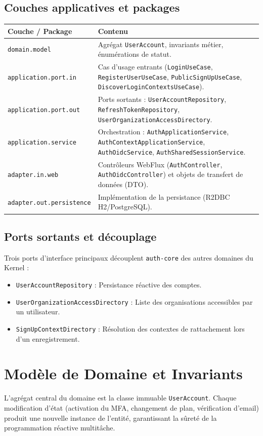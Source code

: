 \documentclass[11pt,a4paper,oneside]{report}
\newcommand{\code}[1]{\texttt{\small #1}}
\begin{document}
\subsection{Couches applicatives et packages}
\begin{center}
\small
\begin{longtable}{@{}p{4cm}p{10cm}@{}}
\toprule
\textbf{Couche / Package} & \textbf{Contenu} \\
\midrule
\code{domain.model} & Agrégat \code{UserAccount}, invariants métier, énumérations de statut. \\
\code{application.port.in} & Cas d'usage entrants (\code{LoginUseCase}, \code{RegisterUserUseCase}, \code{PublicSignUpUseCase}, \code{DiscoverLoginContextsUseCase}). \\
\code{application.port.out} & Ports sortants : \code{UserAccountRepository}, \code{RefreshTokenRepository}, \code{UserOrganizationAccessDirectory}. \\
\code{application.service} & Orchestration : \code{AuthApplicationService}, \code{AuthContextApplicationService}, \code{AuthOidcService}, \code{AuthSharedSessionService}. \\
\code{adapter.in.web} & Contrôleurs WebFlux (\code{AuthController}, \code{AuthOidcController}) et objets de transfert de données (DTO). \\
\code{adapter.out.persistence} & Implémentation de la persistance (R2DBC H2/PostgreSQL). \\
\bottomrule
\end{longtable}
\end{center}

\subsection{Ports sortants et découplage}
Trois ports d'interface principaux découplent \code{auth-core} des autres domaines du Kernel :
\begin{itemize}
  \item \code{UserAccountRepository} : Persistance réactive des comptes.
  \item \code{UserOrganizationAccessDirectory} : Liste des organisations accessibles par un utilisateur.
  \item \code{SignUpContextDirectory} : Résolution des contextes de rattachement lors d'un enregistrement.
\end{itemize}

\section{Modèle de Domaine et Invariants}
L'agrégat central du domaine est la classe immuable \code{UserAccount}. Chaque modification d'état (activation du MFA, changement de plan, vérification d'email) produit une nouvelle instance de l'entité, garantissant la sûreté de la programmation réactive multitâche.
\end{document}
